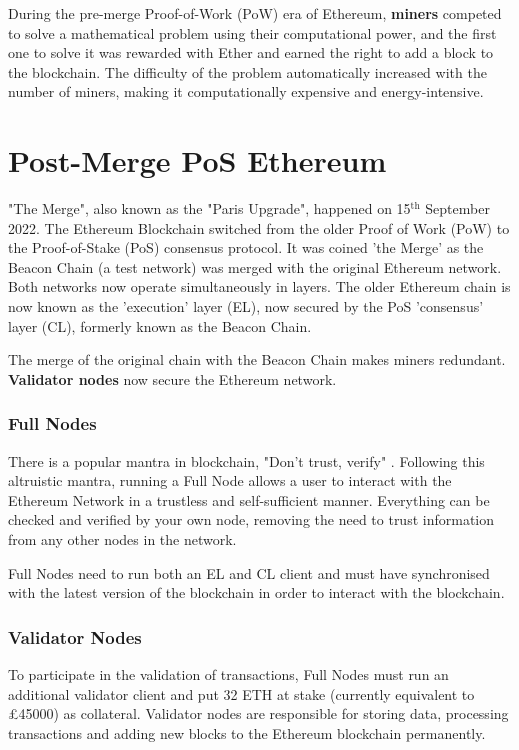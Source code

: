 During the pre-merge Proof-of-Work (PoW) era of Ethereum, \textbf{miners} competed to solve a mathematical problem using their computational power, and the first one to solve it was rewarded with Ether and earned the right to add a block to the blockchain. The difficulty of the problem automatically increased with the number of miners, making it computationally expensive and energy-intensive. 


\section{Post-Merge PoS Ethereum}

"The Merge", also known as the "Paris Upgrade", happened on 15$\mathrm{^{th}}$ September 2022. The Ethereum Blockchain switched from the older Proof of Work (PoW) to the Proof-of-Stake (PoS) consensus protocol. It was coined 'the Merge' as the Beacon Chain (a test network) was merged with the original Ethereum network. Both networks now operate simultaneously in layers. The older Ethereum chain is now known as the 'execution' layer (EL), now secured by the PoS 'consensus' layer (CL), formerly known as the Beacon Chain. 

The merge of the original chain with the Beacon Chain makes miners redundant. \textbf{Validator nodes} now secure the Ethereum network. 

\subsubsection{Full Nodes}
There is a popular mantra in blockchain, "Don't trust, verify" \cite{EthereumEthereum.org}. Following this altruistic mantra, running a Full Node allows a user to interact with the Ethereum Network in a trustless and self-sufficient manner. Everything can be checked and verified by your own node, removing the need to trust information from any other nodes in the network. 

Full Nodes need to run both an EL and CL client and must have  synchronised with the latest version of the blockchain in order to interact with the blockchain. 

\subsubsection{Validator Nodes}
To participate in the validation of transactions, Full Nodes must run an additional validator client and put 32 ETH at stake (currently equivalent to £45000) as collateral. Validator nodes are responsible for storing data, processing transactions and adding new blocks to the Ethereum blockchain permanently. 

